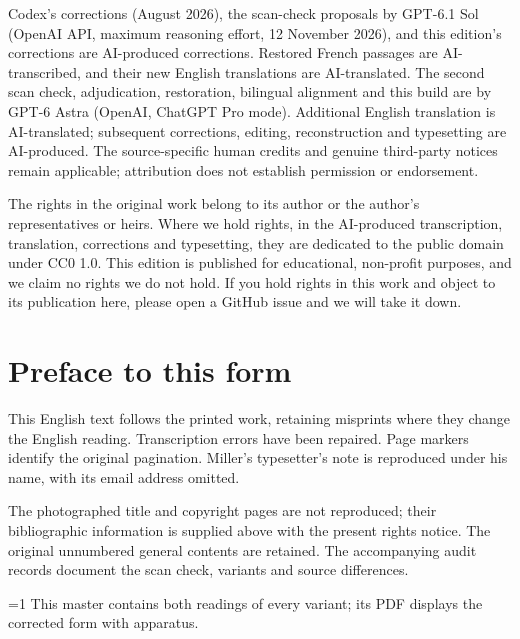 \documentclass[oneside]{book}
\theoremstyle{sga-source}
\theoremstyle{sga-source-dash}
\theoremstyle{sga-source-dotdash}
\theoremstyle{sga-source-number-note-dash}
\theoremstyle{sga-source-note-number-dotdash}
\theoremstyle{sga-source-example-dotdash}
\theoremstyle{sga-source-inline-number}
\theoremstyle{sga-source-bare-number}
\theoremstyle{sga-source}
\providecommand\EditionIsMaster{0}
\begin{document}
\medskip
Codex’s corrections (August 2026), the scan-check proposals by GPT-6.1 Sol
(OpenAI API, maximum reasoning effort, 12 November 2026), and this edition’s
corrections are AI-produced corrections. Restored French passages are
AI-transcribed, and their new English translations are AI-translated.
The second scan check, adjudication, restoration, bilingual alignment and
this build are by GPT-6 Astra (OpenAI, ChatGPT Pro mode).
Additional English translation is AI-translated; subsequent corrections,
editing, reconstruction and typesetting are AI-produced. The
source-specific human credits and genuine third-party notices remain
applicable; attribution does not establish permission or endorsement.

\medskip
The rights in the original work belong to its author or the author's representatives or heirs.
Where we hold rights, in the AI-produced transcription, translation, corrections and typesetting, they are
dedicated to the public domain under CC0 1.0. This edition is published for educational, non-profit purposes,
and we claim no rights we do not hold. If you hold rights in this work and object to its publication here,
please open a GitHub issue and we will take it down.

\chapter*{Preface to this form}
This English text follows the printed work, retaining misprints
where they change the English reading. Transcription errors have been
repaired. Page markers identify the original pagination. Miller’s
typesetter’s note is reproduced under his name, with its email address
omitted.

The photographed title and copyright pages are not reproduced; their
bibliographic information is supplied above with the present rights
notice. The original unnumbered general contents are retained. The
accompanying audit records document the scan check, variants and source
differences.

\ifnum\EditionIsMaster=1\relax
This master contains both readings of every variant; its PDF displays the corrected form with apparatus.
\fi

\clearpage

\or
\end{document}
